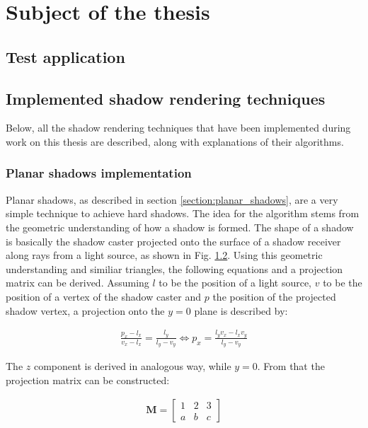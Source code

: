 \chapter{Subject of the thesis}
\label{chapter:3_subject}

\section{Test application}

\section{Implemented shadow rendering techniques}
Below, all the shadow rendering techniques that have been implemented during work on this thesis are described, along with explanations of their algorithms.

\subsection{Planar shadows implementation}
\label{section:planar_shadows_impl}

Planar shadows, as described in section \ref{section:planar_shadows}, are a very simple technique to achieve hard shadows. The idea for the algorithm stems from the geometric understanding of how a shadow is formed. The shape of a shadow is basically the shadow caster projected onto the surface of a shadow receiver along rays from a light source, as shown in Fig. \ref{}. Using this geometric understanding and similiar triangles, the following equations and a projection matrix can be derived. Assuming \(l\) to be the position of a light source, \(v\) to be the position of a vertex of the shadow caster and \(p\) the position of the projected shadow vertex, a projection onto the \(y=0\) plane is described by:

\begin{align}
	\frac{p_x - l_x}{v_x - l_x} = \frac{l_y}{l_y - v_y} \Longleftrightarrow p_x = \frac{l_yv_x - l_xv_y}{l_y - v_y}
\end{align}

The \(z\) component is derived in analogous way, while \(y=0\). From that the projection matrix can be constructed:

\begin{align}
	\mathbf{M} = 
	\begin{bmatrix}
		1 & 2 & 3\\
		a & b & c
	\end{bmatrix}
\end{align}


